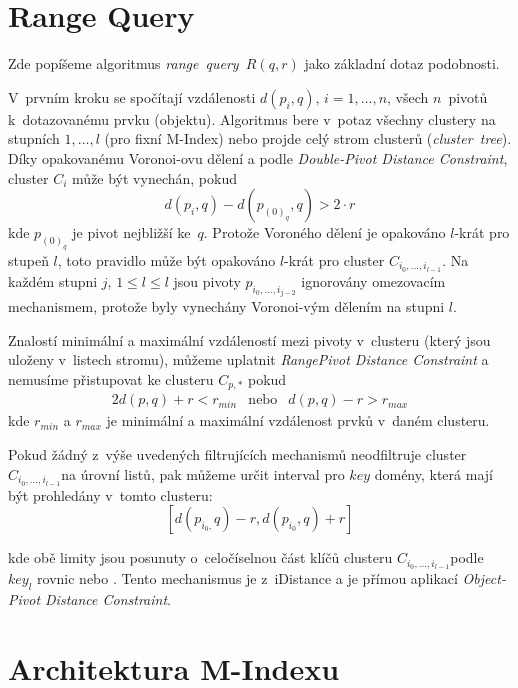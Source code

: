 \section{Range Query\label{sec:Range-Query}}

Zde popíšeme algoritmus \emph{range~query~}$R(q,r)$ jako základní
dotaz podobnosti.

V~prvním kroku se spočítají vzdálenosti $d(p_{i},q),\, i=1,\ldots,n$,
všech $n$~pivotů k~dotazovanému prvku (objektu)\@. Algoritmus
bere v~potaz všechny clustery na stupních $1,\ldots,l$ (pro fixní
M-Index) nebo projde celý strom clusterů (\emph{cluster~tree})\@.
Díky opakovanému Voronoi-ovu dělení a podle \emph{Double-Pivot Distance
Constraint}\cite{similaritysearch2006}, cluster $C_{i}$ může být
vynechán, pokud
\[
d(p_{i},q)-d(p_{(0)_{q}},q)>2\cdot r
\]
kde $p_{(0)_{q}}$ je pivot nejbližší ke~$q$\@. Protože Voroného
dělení je opakováno $l$-krát pro stupeň $l$, toto pravidlo může
být opakováno $l$-krát pro cluster $C_{i_{0},\ldots,i_{l-1}}$\@.
Na každém stupni $j,\,1\leq l\leq l$ jsou pivoty $p_{i_{0},\ldots,i_{j-2}}$
ignorovány omezovacím mechanismem, protože byly vynechány Voronoi-vým
dělením na stupni $l$\@.

Znalostí minimální a maximální vzdáleností mezi pivoty v~clusteru
(který jsou uloženy v~listech stromu), můžeme uplatnit \emph{RangePivot
Distance Constraint}\cite{similaritysearch2006} a nemusíme přistupovat
ke clusteru $C_{p,*}$ pokud
\begin{alignat*}{2}
d(p,q)+r<r_{min} & \textrm{nebo} & d(p,q)-r>r_{max}
\end{alignat*}
kde $r_{min}$ a $r_{max}$ je minimální a maximální vzdálenost prvků
v~daném clusteru\@.

Pokud žádný z~výše uvedených filtrujících mechanismů neodfiltruje
cluster $C_{i_{0},\ldots,i_{l-1}}$na úrovní listů, pak můžeme určit
interval pro $key$ domény, která mají být prohledány v~tomto clusteru:
\[
[d(p_{i_{0},}q)-r,d(p_{i_{0}},q)+r]
\]


kde obě limity jsou posunuty o~celočíselnou část klíčů clusteru $C_{i_{0},\ldots,i_{l-1}}$podle
$key_{l}$ rovnic  nebo \@.
Tento mechanismus je  z~iDistance a je přímou aplikací
\emph{Object-Pivot Distance Constraint}\cite{similaritysearch2006}\@.




\section{Architektura M-Indexu}

